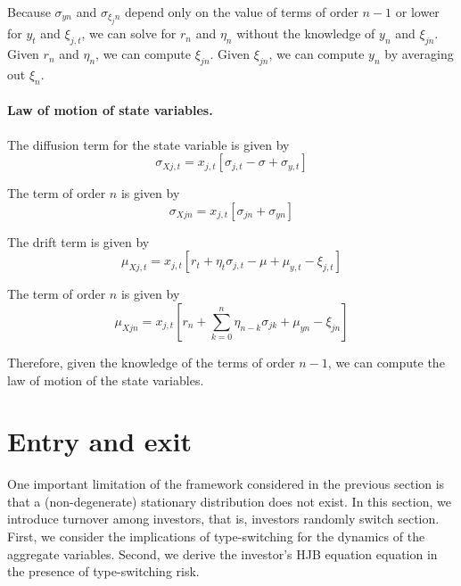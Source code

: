 \documentclass[11pt,english]{article}
\begin{document}
Because $\sigma_{yn}$ and $\sigma_{\xi_jn}$ depend only on the value of terms of order $n-1$ or lower for $y_t$ and $\xi_{j,t}$, we can solve for $r_n$ and $\eta_n$ without the knowledge of $y_n$ and $\xi_{jn}$. Given $r_n$ and $\eta_n$, we can compute $\xi_{jn}$. Given $\xi_{jn}$, we can compute $y_n$ by averaging out $\xi_n$.

\paragraph{Law of motion of state variables.} The diffusion term for the state variable is given by
\begin{equation}
    \sigma_{Xj,t} = x_{j,t} \left[\sigma_{j,t} - \sigma + \sigma_{y,t}\right]
\end{equation}

The term of order $n$ is given by
\begin{equation*}
    \sigma_{Xjn} = x_{j,t} \left[\sigma_{jn} +\sigma_{yn}\right]
\end{equation*}

The drift term is given by
\begin{equation}
    \mu_{Xj,t} = x_{j,t} \left[ r_t + \eta_t \sigma_{j,t} - \mu +\mu_{y,t} - \xi_{j,t} \right]
\end{equation}

The term of order $n$ is given by
\begin{equation}
    \mu_{Xjn} = x_{j,t} \left[ r_n + \sum_{k=0}^n \eta_{n-k} \sigma_{jk} + \mu_{yn} - \xi_{jn} \right]
\end{equation}

Therefore, given the knowledge of the terms of order $n-1$, we can compute the law of motion of the state variables.

\section{Entry and exit}

One important limitation of the framework considered in the previous section is that a (non-degenerate) stationary distribution does not exist. In this section, we introduce turnover among investors, that is, investors randomly switch section. 
First, we consider the implications of type-switching for the dynamics of the aggregate variables. 
Second, we derive the investor's HJB equation equation in the presence of type-switching risk. 

\end{document}

